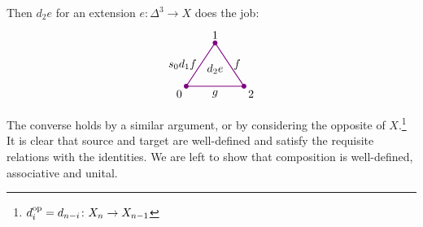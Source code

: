         Then $d_2 e$ for an extension $e \colon \Delta^3 \to X$ does the job:
        \begin{equation*}
            \begin{tikzpicture}[
                scale=0.9, 
                thick, 
                color=violet, 
                every node/.style={text=black},
                dot/.style={circle, fill=violet, inner sep=1.5pt, outer sep=0pt}
            ]

                \coordinate (O) at (0,0);       %
                \coordinate (A) at (1, 1.5);    %
                \coordinate (B) at (2, 0);      %

                \draw (O) -- node[left] {$s_0 d_1 f$} (A) 
                    -- node[right] {$f$} (B) 
                    -- node[below] {$g$} cycle;

                \node[dot] at (O) {};
                \node[dot] at (A) {};
                \node[dot] at (B) {};

                \node[below left] at (O) {0};
                \node[above] at (A) {1};
                \node[below right] at (B) {2};

                \node[scale=1.0] at (1, 0.6) {$d_2 e$};

            \end{tikzpicture}            
        \end{equation*}
        The converse holds by a similar argument, or by considering the opposite of $X$.\footnote{$d^{\operatorname{op}}_i = d_{n - i} \colon X_n \to X_{n-1}$} It is clear that source and target are well-defined and satisfy the requisite relations with the identities. We are left to show that composition is well-defined, associative and unital.

